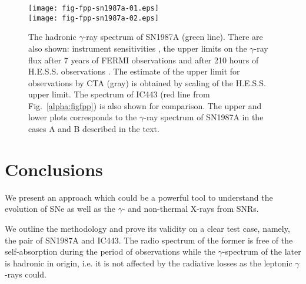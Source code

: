 \documentclass{aa}
\newcommand\g{$\gamma$}
\begin{document}
\begin{figure}
 \centering
 \texttt{[image: fig-fpp-sn1987a-01.eps]}\\ 
 \texttt{[image: fig-fpp-sn1987a-02.eps]}
 \caption{The hadronic \g-ray spectrum of SN1987A (green line). 
There are also shown: instrument sensitivities \citep{Funk-Hinton-2013}, the upper limits on the \g-ray flux after 7 years of FERMI observations \citep[orange,][]{Fermi-2016} and after 210 hours of H.E.S.S. observations \cite[blue,][]{HESS-2015}. The estimate of the upper limit for observations by CTA (gray) is obtained by scaling of the H.E.S.S. upper limit. The spectrum of IC443 (red line from Fig.~\ref{alpha:figfpp}) is also shown for comparison. 
The upper and lower plots corresponds to the \g-ray spectrum of SN1987A in the cases A and B described in the text.}
 \label{alpha:figappsn87a}
\end{figure}


\section{Conclusions}
\label{alpha:sect-concl}

We present an approach which could be a powerful tool to understand the evolution of SNe as well as the \g- and non-thermal X-rays from SNRs.

We outline the methodology and prove its validity on a clear test case, namely, the pair of SN1987A and IC443. The radio spectrum of the former is free of the self-absorption during the period of observations while the \g-spectrum of the later is hadronic in origin, i.e. it is not affected by the radiative losses as the leptonic \g-rays could.
\end{document}
